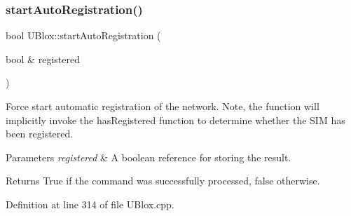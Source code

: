 \subsubsection{\texorpdfstring{start\+Auto\+Registration()}{startAutoRegistration()}}
{\footnotesize\ttfamily bool U\+Blox\+::start\+Auto\+Registration (\begin{DoxyParamCaption}\item[{bool \&}]{registered }\end{DoxyParamCaption})}

Force start automatic registration of the network. Note, the function will implicitly invoke the has\+Registered function to determine whether the S\+IM has been registered.


\begin{DoxyParams}{Parameters}
{\em registered} & A boolean reference for storing the result. \\
\hline
\end{DoxyParams}
\begin{DoxyReturn}{Returns}
True if the command was successfully processed, false otherwise. 
\end{DoxyReturn}


Definition at line 314 of file U\+Blox.\+cpp.



